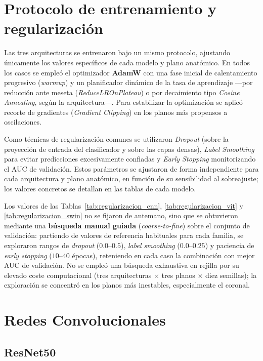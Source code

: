 \section{Protocolo de entrenamiento y regularización}
\label{sec:protocolo_entrenamiento}

Las tres arquitecturas se entrenaron bajo un mismo protocolo, ajustando únicamente los valores específicos de cada modelo y plano anatómico. En todos los casos se empleó el optimizador \textbf{AdamW} con una fase inicial de calentamiento progresivo (\textit{warmup}) y un planificador dinámico de la tasa de aprendizaje ---por reducción ante meseta (\textit{ReduceLROnPlateau}) o por decaimiento tipo \textit{Cosine Annealing}, según la arquitectura---. Para estabilizar la optimización se aplicó recorte de gradientes (\textit{Gradient Clipping}) en los planos más propensos a oscilaciones.

Como técnicas de regularización comunes se utilizaron \textit{Dropout} (sobre la proyección de entrada del clasificador y sobre las capas densas), \textit{Label Smoothing} para evitar predicciones excesivamente confiadas y \textit{Early Stopping} monitorizando el AUC de validación. Estos parámetros se ajustaron de forma independiente para cada arquitectura y plano anatómico, en función de su sensibilidad al sobreajuste; los valores concretos se detallan en las tablas de cada modelo.

Los valores de las Tablas~\ref{tab:regularizacion_cnn}, \ref{tab:regularizacion_vit} y \ref{tab:regularizacion_swin} no se fijaron de antemano, sino que se obtuvieron mediante una \textbf{búsqueda manual guiada} (\textit{coarse-to-fine}) sobre el conjunto de validación: partiendo de valores de referencia habituales para cada familia, se exploraron rangos de \textit{dropout} ($0.0$--$0.5$), \textit{label smoothing} ($0.0$--$0.25$) y paciencia de \textit{early stopping} ($10$--$40$ épocas), reteniendo en cada caso la combinación con mejor AUC de validación. No se empleó una búsqueda exhaustiva en rejilla por su elevado coste computacional (tres arquitecturas $\times$ tres planos $\times$ diez semillas); la exploración se concentró en los planos más inestables, especialmente el coronal.

\section{Redes Convolucionales}
\label{sec:redes_convolucionales}

\subsection{ResNet50}
\label{subsec:cnn_resnet50}

